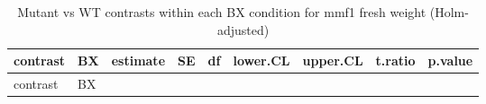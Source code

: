 \documentclass[
  10pt,
]{article}
\begin{document}
\begin{longtable}[]{@{}
  >{\raggedright\arraybackslash}p{}
  >{\raggedright\arraybackslash}p{}
  >{\raggedleft\arraybackslash}p{}
  >{\raggedleft\arraybackslash}p{}
  >{\raggedleft\arraybackslash}p{}
  >{\raggedleft\arraybackslash}p{}
  >{\raggedleft\arraybackslash}p{}
  >{\raggedleft\arraybackslash}p{}
  >{\raggedleft\arraybackslash}p{}@{}}
\caption{Mutant vs WT contrasts within each BX condition for mmf1 fresh
weight (Holm-adjusted)}\tabularnewline
\toprule\noalign{}
\begin{minipage}[b]{\linewidth}\raggedright
contrast
\end{minipage} & \begin{minipage}[b]{\linewidth}\raggedright
BX
\end{minipage} & \begin{minipage}[b]{\linewidth}\raggedleft
estimate
\end{minipage} & \begin{minipage}[b]{\linewidth}\raggedleft
SE
\end{minipage} & \begin{minipage}[b]{\linewidth}\raggedleft
df
\end{minipage} & \begin{minipage}[b]{\linewidth}\raggedleft
lower.CL
\end{minipage} & \begin{minipage}[b]{\linewidth}\raggedleft
upper.CL
\end{minipage} & \begin{minipage}[b]{\linewidth}\raggedleft
t.ratio
\end{minipage} & \begin{minipage}[b]{\linewidth}\raggedleft
p.value
\end{minipage} \\
\midrule\noalign{}
\endfirsthead
\toprule\noalign{}
\begin{minipage}[b]{\linewidth}\raggedright
contrast
\end{minipage} & \begin{minipage}[b]{\linewidth}\raggedright
BX
\end{minipage} & \begin{minipage}[b]{\linewidth}\raggedleft

\end{minipage}
\end{longtable}
\end{document}
